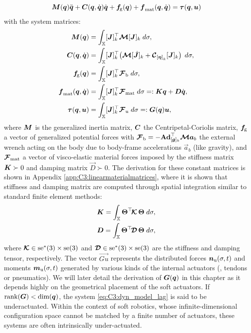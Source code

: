 %
\begin{equation}
  \boldsymbol{M}(\boldsymbol{q})\ddot{\boldsymbol{q}} + \boldsymbol{C}(\boldsymbol{q},\dot{\boldsymbol{q}})\dot{\boldsymbol{q}} + \boldsymbol{f}\!_{\scriptstyle\textrm{g}}(\boldsymbol{q}) + \boldsymbol{f}_{\textrm{mat}}(\boldsymbol{q},\dot{\boldsymbol{q}}) = \boldsymbol{\tau}(\boldsymbol{q},{\boldsymbol{u}})
  \label{eq:C3:dyn_model_lag}
\end{equation}
%
with the system matrices:
%
\begin{align}
 {\boldsymbol{M}}({\boldsymbol{q}}) & = \int_{\mathbb{X}} [\boldsymbol{J}]_k^\top \boldsymbol{\mathcal{M}} [\boldsymbol{J}]_k \; d \sigma, \label{eq:C3:lag_M} \\
 \boldsymbol{C}({\boldsymbol{q}},{\dot{\boldsymbol{q}}}) & = \int_{\mathbb{X}} [{\boldsymbol{J}}]_k^\top \!\left(\boldsymbol{\mathcal{M}} [\,\,\dot{\!\!\boldsymbol{J}}]_k + \boldsymbol{\mathcal{C}}_{{[\boldsymbol{\eta}]}_k}[\boldsymbol{J}]_k \right) \; d \sigma, \label{eq:C3:lag_C} \\
\boldsymbol{f}\!_{\scriptstyle\textrm{g}}({\boldsymbol{q}}) & = \int_{\mathbb{X}} [{\boldsymbol{J}}]_k^\top \boldsymbol{\mathcal{F}}_\textrm{b} \; d \sigma, \\
\boldsymbol{f}_{\textrm{mat}}({\boldsymbol{q}},{\dot{\boldsymbol{q}}}) & = \int_{\mathbb{X}} [{\boldsymbol{J}}]_k^\top  \boldsymbol{\mathcal{F}}_{\textrm{mat}} \; d \sigma =: \boldsymbol{K}\boldsymbol{q} + \boldsymbol{D}\dot{\boldsymbol{q}},
\label{eq:C3:lag_G} \\
\boldsymbol{\tau}({\boldsymbol{q}},{\boldsymbol{u}}) & = \int_{\mathbb{X}} [\boldsymbol{J}]_k^\top \boldsymbol{\mathcal{F}}_u \; d\sigma =: \boldsymbol{G}({\boldsymbol{q}}) \boldsymbol{u}, \label{eq:C3:lag_tau}
\end{align}
%
\noindent where $\boldsymbol{M}$ is the generalized inertia matrix, $\boldsymbol{C}$ the  Centripetal-Coriolis matrix, ${\boldsymbol{f}}\!_{\scriptstyle\textrm{g}}$ a vector of generalized potential forces with $\boldsymbol{\mathcal{F}}_\textrm{b} = -\textbf{Ad}_{[{\boldsymbol{g}}]_k}^\top \boldsymbol{\mathcal{M}} \boldsymbol{a}_b$ the external wrench acting on the body due to body-frame accelerations $\vec{a}_b$ (like gravity), and $\boldsymbol{\mathcal{F}}_\textrm{mat}$ a vector of visco-elastic material forces imposed by the stiffness matrix $\boldsymbol{K} \succ 0$ and damping matrix $\vec{D} \succ 0$. The derivation for these constant matrices is shown in Appendix \ref{app:C3:linearmaterialmatrices}, where it is shown that stiffness and damping matrix are computed through spatial integration similar to standard finite element methods:
%
\begin{align}
\boldsymbol{K} = \int_{\mathbb{X}} \boldsymbol{\Theta}^\top \!\boldsymbol{\mathcal{K}}\, \boldsymbol{\Theta} \; d\sigma, \label{eq:C3:stiff_mat}\\
\boldsymbol{D} = \int_{\mathbb{X}} \boldsymbol{\Theta}^\top \!\boldsymbol{\mathcal{D}}\, \boldsymbol{\Theta} \; d\sigma, \label{eq:C3:damp_mat}
\end{align}
%
where $\boldsymbol{\mathcal{K}} \in \textup{\textrm{se}}^*(3) \times \textup{\textrm{se}}(3)$ and $\boldsymbol{\mathcal{D}} \in  \textup{\textrm{se}}^*(3) \times \textup{\textrm{se}}(3)$ are the stiffness and damping tensor, respectively.
The vector $\vec{Gu}$ represents the distributed forces ${\boldsymbol{n}}_\textrm{u}(\sigma,t)$ and moments ${\boldsymbol{m}}_\textrm{u}(\sigma,t)$ generated by various kinds of the internal actuators (\eg, tendons or pneumatics). We will later detail the derivation of ${\boldsymbol{G}}({\boldsymbol{q}})$ in this chapter as it depends highly on the geometrical placement of the soft actuators. If $\textnormal{rank}({\boldsymbol{G}}) < \text{dim}({\boldsymbol{q}})$, the system \eqref{eq:C3:dyn_model_lag} is said to be underactuated. Within the context of soft robotics, whose infinite-dimensional configuration space cannot be matched by a finite number of actuators, these systems are often intrinsically under-actuated. 

